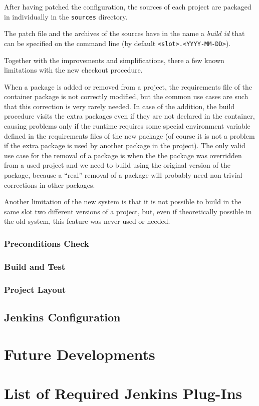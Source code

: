 \documentclass{lhcbnote}
\begin{document}
After having patched the configuration, the sources of each project are packaged
in individually in the \texttt{sources} directory.

The patch file and the archives of the sources have in the name a \emph{build
id} that can be specified on the command line (by default
\texttt{<slot>.<YYYY-MM-DD>}).

Together with the improvements and simplifications, there a few known
limitations with the new checkout procedure.

When a package is added or removed from a project, the requirements file of the
container package is not correctly modified, but the common use cases are such
that this correction is very rarely needed.  In case of the addition, the build
procedure visits the extra packages even if they are not declared in the
container, causing problems only if the runtime requires some special
environment variable defined in the requirements files of the new package (of
course it is not a problem if the extra package is used by another package in
the project).  The only valid use case for the removal of a package is when the
the package was overridden from a used project and we need to build using the
original version of the package, because a ``real'' removal of a package will
probably need non trivial corrections in other packages.

Another limitation of the new system is that it is not possible to build in the
same slot two different versions of a project, but, even if theoretically
possible in the old system, this feature was never used or needed.

\subsubsection{Preconditions Check}

\subsubsection{Build and Test}


\subsubsection{Project Layout}


\subsection{Jenkins Configuration}

\section{Future Developments}





%


\appendix
\section{List of Required Jenkins Plug-Ins}
\end{document}
